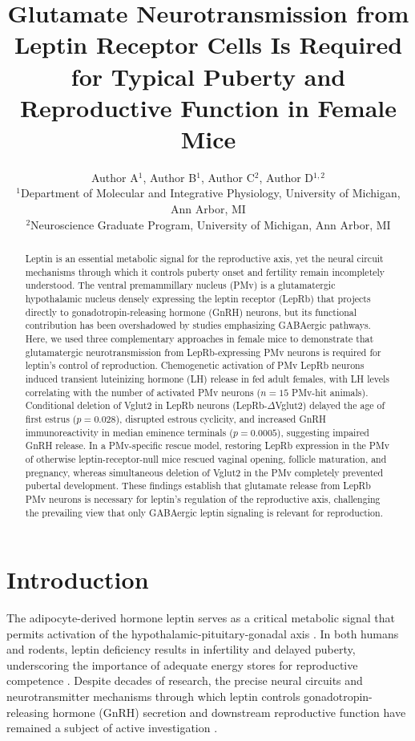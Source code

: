 \documentclass[12pt]{article}
\title{Glutamate Neurotransmission from Leptin Receptor Cells Is Required for Typical Puberty and Reproductive Function in Female Mice}
\author{Author A$^{1}$, Author B$^{1}$, Author C$^{2}$, Author D$^{1,2}$ \\
\small $^{1}$Department of Molecular and Integrative Physiology, University of Michigan, Ann Arbor, MI \\
\small $^{2}$Neuroscience Graduate Program, University of Michigan, Ann Arbor, MI}
\date{}
\begin{document}
\maketitle

\begin{abstract}
Leptin is an essential metabolic signal for the reproductive axis, yet the neural circuit mechanisms through which it controls puberty onset and fertility remain incompletely understood. The ventral premammillary nucleus (PMv) is a glutamatergic hypothalamic nucleus densely expressing the leptin receptor (LepRb) that projects directly to gonadotropin-releasing hormone (GnRH) neurons, but its functional contribution has been overshadowed by studies emphasizing GABAergic pathways. Here, we used three complementary approaches in female mice to demonstrate that glutamatergic neurotransmission from LepRb-expressing PMv neurons is required for leptin's control of reproduction. Chemogenetic activation of PMv LepRb neurons induced transient luteinizing hormone (LH) release in fed adult females, with LH levels correlating with the number of activated PMv neurons ($n = 15$ PMv-hit animals). Conditional deletion of Vglut2 in LepRb neurons (LepRb-$\Delta$Vglut2) delayed the age of first estrus ($p = 0.028$), disrupted estrous cyclicity, and increased GnRH immunoreactivity in median eminence terminals ($p = 0.0005$), suggesting impaired GnRH release. In a PMv-specific rescue model, restoring LepRb expression in the PMv of otherwise leptin-receptor-null mice rescued vaginal opening, follicle maturation, and pregnancy, whereas simultaneous deletion of Vglut2 in the PMv completely prevented pubertal development. These findings establish that glutamate release from LepRb PMv neurons is necessary for leptin's regulation of the reproductive axis, challenging the prevailing view that only GABAergic leptin signaling is relevant for reproduction.
\end{abstract}

\section{Introduction}

The adipocyte-derived hormone leptin serves as a critical metabolic signal that permits activation of the hypothalamic-pituitary-gonadal axis \citep{elias2012leptin}. In both humans and rodents, leptin deficiency results in infertility and delayed puberty, underscoring the importance of adequate energy stores for reproductive competence \citep{clarke2015effects}. Despite decades of research, the precise neural circuits and neurotransmitter mechanisms through which leptin controls gonadotropin-releasing hormone (GnRH) secretion and downstream reproductive function have remained a subject of active investigation \citep{herbison2016gnrh}.
\end{document}
